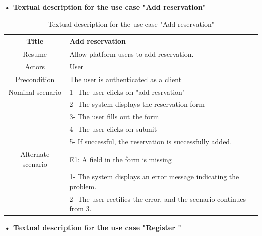 \textbf{• \textbf{Textual description for the use case "Add reservation" }}

\begin{table}
    \centering
    \begin{tabular}{|c|l|} \hline 
         Title& Add reservation\\ \hline 
         Resume& Allow platform users to add reservation.\\ \hline 
         Actors& User \\ \hline 
         Precondition&The user is authenticated as a client\\\hline \hline 
         Nominal scenario& 1- The user clicks on "add resrvation"\\ \hline 
 &2- The system displays the reservation form\\ \hline 
 &3- The user fills out the form\\ \hline 
 &4- The user clicks on submit\\ \hline 
 &5- If successful, the reservation is successfully added.\\\hline \hline 
         Alternate scenario& E1: A field in the form is missing\\ \hline 
 &1- The system displays an error message indicating the problem.\\ \hline 
 &2- The user rectifies the error, and the scenario continues from 3.\\ \hline
    \end{tabular}
    \caption{Textual description for the use case "Add reservation"}
    \label{Textual description for the use case "Add reservation"}
\end{table}

\textbf{• \textbf{Textual description for the use case "Register " }}


